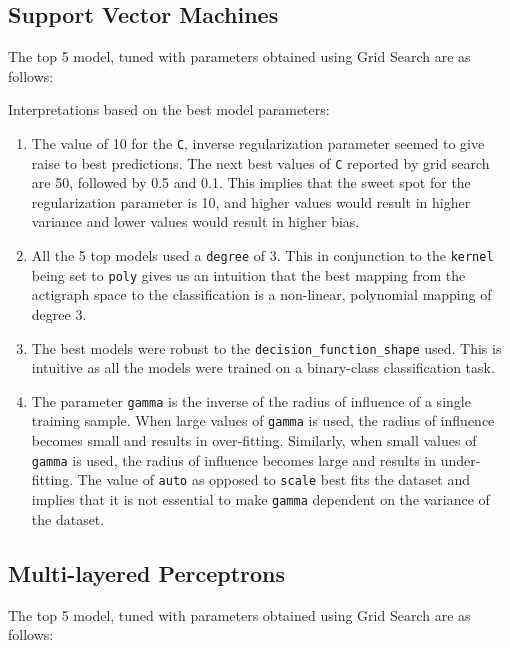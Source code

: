 \documentclass[11pt,a4paper]{article}
\newcommand{\noi}{\noindent}
\begin{document}
\subsection{Support Vector Machines}
The top 5 model, tuned with parameters obtained using Grid Search are as follows:


\noi
Interpretations based on the best model parameters:
\begin{enumerate}
	\itemsep0em
	\item The value of 10 for the \texttt{C}, inverse regularization parameter seemed to give raise to best predictions. The next best values of \texttt{C} reported by grid search are 50, followed by 0.5 and 0.1. This implies that the sweet spot for the regularization parameter is 10, and higher values would result in higher variance and lower values would result in higher bias.
	\item All the 5 top models used a \texttt{degree} of 3. This in conjunction to the \texttt{kernel} being set to \texttt{poly} gives us an intuition that the best mapping from the actigraph space to the classification is a non-linear, polynomial mapping of degree 3.
	\item The best models were robust to the \texttt{decision\_function\_shape} used. This is intuitive as all the models were trained on a binary-class classification task.
	\item The parameter \texttt{gamma} is the inverse of the radius of influence of a single training sample. When large values of \texttt{gamma} is used, the radius of influence becomes small and results in over-fitting. Similarly, when small values of \texttt{gamma} is used, the radius of influence becomes large and results in under-fitting. The value of \texttt{auto} as opposed to \texttt{scale} best fits the dataset and implies that it is not essential to make \texttt{gamma} dependent on the variance of the dataset.
\end{enumerate}

\subsection{Multi-layered Perceptrons}
The top 5 model, tuned with parameters obtained using Grid Search are as follows:

\end{document}
